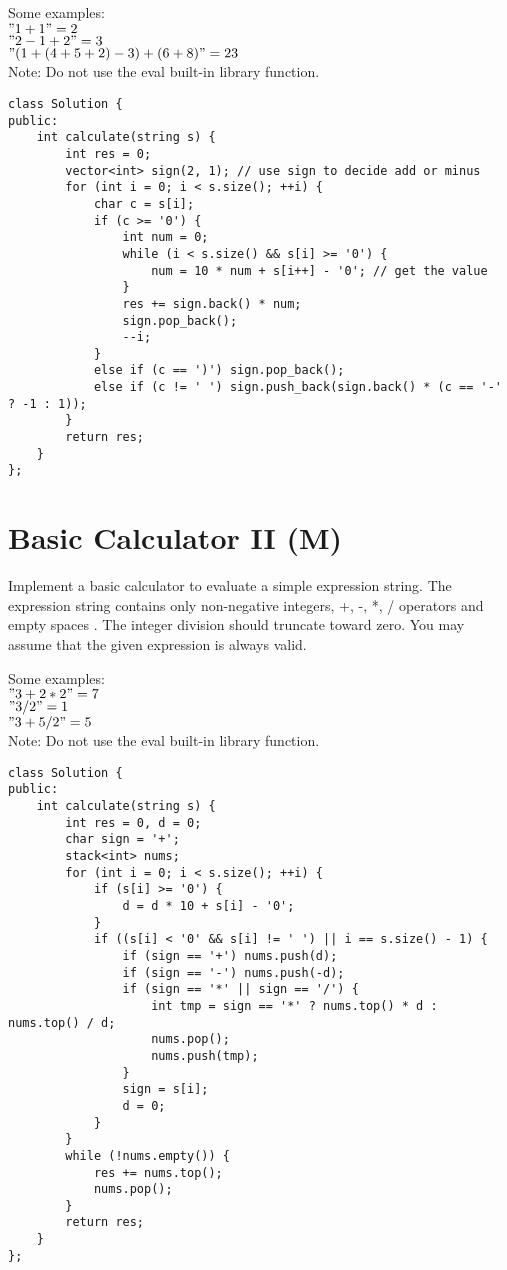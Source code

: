 Some examples:\\
$"1 + 1" = 2$\\
$" 2-1 + 2 " = 3$\\
$"(1+(4+5+2)-3)+(6+8)" = 23$\\

Note: Do not use the eval built-in library function. \\

\begin{lstlisting}
class Solution {
public:
    int calculate(string s) {
        int res = 0;
        vector<int> sign(2, 1); // use sign to decide add or minus
        for (int i = 0; i < s.size(); ++i) {
            char c = s[i];
            if (c >= '0') {
                int num = 0;
                while (i < s.size() && s[i] >= '0') {
                    num = 10 * num + s[i++] - '0'; // get the value
                }
                res += sign.back() * num;
                sign.pop_back();
                --i;
            }
            else if (c == ')') sign.pop_back();
            else if (c != ' ') sign.push_back(sign.back() * (c == '-' ? -1 : 1));
        }
        return res;
    }
};
\end{lstlisting}


\section{Basic Calculator II (M)}
Implement a basic calculator to evaluate a simple expression string. The expression string contains only non-negative integers, +, -, *, / operators and empty spaces . The integer division should truncate toward zero. You may assume that the given expression is always valid.

Some examples:\\
$"3+2*2" = 7$\\
$" 3/2 " = 1$\\
$" 3+5 / 2 " = 5$\\

Note: Do not use the eval built-in library function. \\

\begin{lstlisting}
class Solution {
public:
    int calculate(string s) {
        int res = 0, d = 0;
        char sign = '+';
        stack<int> nums;
        for (int i = 0; i < s.size(); ++i) {
            if (s[i] >= '0') {
                d = d * 10 + s[i] - '0';
            }
            if ((s[i] < '0' && s[i] != ' ') || i == s.size() - 1) {
                if (sign == '+') nums.push(d);
                if (sign == '-') nums.push(-d);
                if (sign == '*' || sign == '/') {
                    int tmp = sign == '*' ? nums.top() * d : nums.top() / d;
                    nums.pop();
                    nums.push(tmp);
                }
                sign = s[i];
                d = 0;
            } 
        }
        while (!nums.empty()) {
            res += nums.top();
            nums.pop();
        }
        return res;
    }
};
\end{lstlisting}


